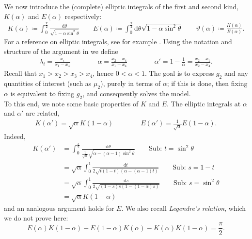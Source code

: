 \documentclass[10pt]{article}
\newcommand{\dif}{\mathrm{d}}
\theoremstyle{plain}
\theoremstyle{definition}
\theoremstyle{plain}
\begin{document}
We now introduce the (complete) elliptic integrals of the first and second kind, $K(\alpha)$ and $E(\alpha)$ respectively:
\begin{align*}
	K(\alpha) \coloneqq \int_0^{\frac{\pi}{2}} \frac{\dif\theta}{\sqrt{1-\alpha\sin^2\theta}} \qquad E(\alpha)\coloneqq \int_0^{\frac{\pi}{2}} \dif\theta \sqrt{1-\alpha\sin^2\theta} \qquad \vartheta(\alpha) \coloneqq \frac{K(\alpha)}{E(\alpha)}.
\end{align*}
For a reference on elliptic integrals, see for example \cite{lawden_elliptic}. Using the notation and structure of the argument in \cite{kazakov1999d} we define
\begin{align*}
	\lambda_i = \frac{x_i}{x_1-x_4} \qquad\qquad
	\alpha = \frac{x_2-x_4}{x_1-x_4} \qquad\qquad \alpha' = 1 - \frac{1}{\alpha} = \frac{x_2-x_1}{x_2-x_4}.
\end{align*}
Recall that $x_1 > x_2 > x_3 > x_4$, hence $0 < \alpha < 1$. The goal is to express $g_2$ and any quantities of interest (such as $\mu_2$), purely in terms of $\alpha$; if this is done, then fixing $\alpha$ is equivalent to fixing $g_2$, and consequently solves the model. \\

To this end, we note some basic properties of $K$ and $E$. The elliptic integrals at $\alpha$ and $\alpha'$ are related,
\begin{align*}
	K(\alpha') = \sqrt{\alpha}K(1-\alpha) \qquad \qquad E(\alpha') = \frac{1}{\sqrt{\alpha}}E(1-\alpha).
\end{align*}
Indeed,
\begin{align*}
	K(\alpha') &= \int_0^{\frac{\pi}{2}} \frac{\dif\theta}{\frac{1}{\sqrt{\alpha}}\sqrt{\alpha-(\alpha-1)\sin^2\theta}} \qquad\text{Sub: } t = \sin^2\theta \\
	&= \sqrt{\alpha}\int_0^1 \frac{\dif t}{2\sqrt{t(1-t)(\alpha-(\alpha-1)t)}} \qquad \text{Sub: } s = 1-t \\
	&= \sqrt{\alpha}\int_0^1 \frac{\dif s}{2\sqrt{(1-s)s(1-(1-\alpha)s)}} \qquad \text{Sub: } s = \sin^2\theta \\
	&= \sqrt{\alpha}K(1-\alpha)
\end{align*}
and an analogous argument holds for $E$. We also recall \textit{Legendre's relation}, which we do not prove here:
\[ E(\alpha)K(1-\alpha) + E(1-\alpha)K(\alpha)-K(\alpha)K(1-\alpha) = \frac{\pi}{2}. \]
\end{document}
